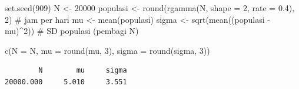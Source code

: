 \documentclass[
  indonesian,
  letterpaper,
]{book}
\newenvironment{Shaded}{\begin{snugshade}}{\end{snugshade}}
\newcommand{\AttributeTok}[1]{\textcolor[rgb]{0.40,0.45,0.13}{#1}}
\newcommand{\CommentTok}[1]{\textcolor[rgb]{0.37,0.37,0.37}{#1}}
\newcommand{\DecValTok}[1]{\textcolor[rgb]{0.68,0.00,0.00}{#1}}
\newcommand{\FloatTok}[1]{\textcolor[rgb]{0.68,0.00,0.00}{#1}}
\newcommand{\FunctionTok}[1]{\textcolor[rgb]{0.28,0.35,0.67}{#1}}
\newcommand{\NormalTok}[1]{\textcolor[rgb]{0.00,0.23,0.31}{#1}}
\newcommand{\OtherTok}[1]{\textcolor[rgb]{0.00,0.23,0.31}{#1}}
\newcommand{\SpecialCharTok}[1]{\textcolor[rgb]{0.37,0.37,0.37}{#1}}
\begin{document}
\begin{Shaded}
\begin{Highlighting}[]
\FunctionTok{set.seed}\NormalTok{(}\DecValTok{909}\NormalTok{)}
\NormalTok{N }\OtherTok{\textless{}{-}} \DecValTok{20000}
\NormalTok{populasi }\OtherTok{\textless{}{-}} \FunctionTok{round}\NormalTok{(}\FunctionTok{rgamma}\NormalTok{(N, }\AttributeTok{shape =} \DecValTok{2}\NormalTok{, }\AttributeTok{rate =} \FloatTok{0.4}\NormalTok{), }\DecValTok{2}\NormalTok{)   }\CommentTok{\# jam per hari}
\NormalTok{mu    }\OtherTok{\textless{}{-}} \FunctionTok{mean}\NormalTok{(populasi)}
\NormalTok{sigma }\OtherTok{\textless{}{-}} \FunctionTok{sqrt}\NormalTok{(}\FunctionTok{mean}\NormalTok{((populasi }\SpecialCharTok{{-}}\NormalTok{ mu)}\SpecialCharTok{\^{}}\DecValTok{2}\NormalTok{))                   }\CommentTok{\# SD populasi (pembagi N)}

\FunctionTok{c}\NormalTok{(}\AttributeTok{N =}\NormalTok{ N, }\AttributeTok{mu =} \FunctionTok{round}\NormalTok{(mu, }\DecValTok{3}\NormalTok{), }\AttributeTok{sigma =} \FunctionTok{round}\NormalTok{(sigma, }\DecValTok{3}\NormalTok{))}
\end{Highlighting}
\end{Shaded}

\begin{verbatim}
        N        mu     sigma 
20000.000     5.010     3.551 
\end{verbatim}
\end{document}
